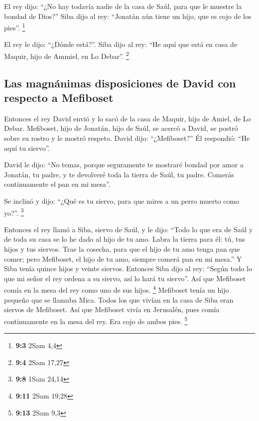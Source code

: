  El rey dijo: ``¿No hay todavía nadie de la casa de Saúl,
para que le muestre la bondad de Dios?'' Siba dijo al rey: ``Jonatán aún
tiene un hijo, que es cojo de los pies''. \footnote{\textbf{9:3} 2Sam
  4,4}

 El rey le dijo: ``¿Dónde está?''. Siba dijo al rey: ``He
aquí que está en casa de Maquir, hijo de Ammiel, en Lo Debar''.
\footnote{\textbf{9:4} 2Sam 17,27}

\hypertarget{las-magnuxe1nimas-disposiciones-de-david-con-respecto-a-mefiboset}{%
\subsection{Las magnánimas disposiciones de David con respecto a
Mefiboset}\label{las-magnuxe1nimas-disposiciones-de-david-con-respecto-a-mefiboset}}

 Entonces el rey David envió y lo sacó de la casa de
Maquir, hijo de Amiel, de Lo Debar.  Mefiboset, hijo de
Jonatán, hijo de Saúl, se acercó a David, se postró sobre su rostro y le
mostró respeto. David dijo: ``¿Mefiboset?'' Él respondió: ``He aquí tu
siervo''.

 David le dijo: ``No temas, porque seguramente te mostraré
bondad por amor a Jonatán, tu padre, y te devolveré toda la tierra de
Saúl, tu padre. Comerás continuamente el pan en mi mesa''.

 Se inclinó y dijo: ``¿Qué es tu siervo, para que mires a
un perro muerto como yo?''. \footnote{\textbf{9:8} 1Sam 24,14}

 Entonces el rey llamó a Siba, siervo de Saúl, y le dijo:
``Todo lo que era de Saúl y de toda su casa se lo he dado al hijo de tu
amo.  Labra la tierra para él: tú, tus hijos y tus
siervos. Trae la cosecha, para que el hijo de tu amo tenga pan que
comer; pero Mefiboset, el hijo de tu amo, siempre comerá pan en mi
mesa.'' Y Siba tenía quince hijos y veinte siervos. 
Entonces Siba dijo al rey: ``Según todo lo que mi señor el rey ordena a
su siervo, así lo hará tu siervo''. Así que Mefiboset comía en la mesa
del rey como uno de sus hijos. \footnote{\textbf{9:11} 2Sam 19,28}
 Mefiboset tenía un hijo pequeño que se llamaba Mica.
Todos los que vivían en la casa de Siba eran siervos de Mefiboset.
 Así que Mefiboset vivía en Jerusalén, pues comía
continuamente en la mesa del rey. Era cojo de ambos pies. \footnote{\textbf{9:13}
  2Sam 9,3}

